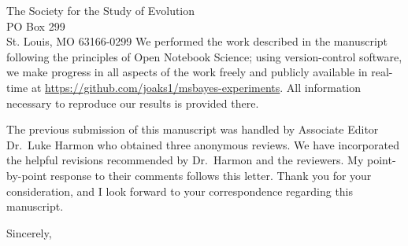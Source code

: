 \documentclass[letterpaper]{letter}
\begin{document}
\begin{letter}{The Society for the Study of Evolution \\
                     PO Box 299 \\
                     St. Louis, MO 63166-0299}
We performed the work described in the manuscript following the principles of
Open Notebook Science; using version-control software, we make progress in all
aspects of the work freely and publicly available in real-time at
\href{https://github.com/joaks1/msbayes-experiments}{\url{https://github.com/joaks1/msbayes-experiments}}.
All information necessary to reproduce our results is provided there.

The previous submission of this manuscript was handled by Associate Editor Dr.\
Luke Harmon who obtained three anonymous reviews.
We have incorporated the helpful revisions recommended by Dr.\ Harmon and the
reviewers.
My point-by-point response to their comments follows this letter.
Thank you for your consideration, and I look forward to your correspondence
regarding this manuscript.


\addtolength{\medskipamount}{-5pt}
\closing{Sincerely,}
\end{letter}
\end{document}
